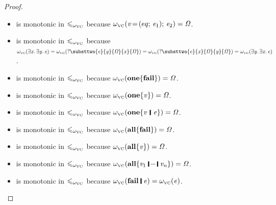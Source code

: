 \begin{proof}
\begin{itemize}
\item {} is monotonic in $\mathrel{\leqslant_{\omega_{\scriptscriptstyle\mathrm{VC}}}}$
because $\omega_{\scriptscriptstyle\mathrm{VC}}(\mathit{v}\hspace{-0.14em}=\hspace{-0.14em}(eq;\,\mathit{e}_{\mathrm{1}});\,\mathit{e}_{\mathrm{2}}) = \mathit{\Omega}$.

\item {} is monotonic in $\mathrel{\leqslant_{\omega_{\scriptscriptstyle\mathrm{VC}}}}$ \hfill\break
because $\omegavc(\ensuremath{\exists\Varid{x}.\,\exists\Varid{y}.\,\Varid{e}}) = \omegavc({?}\ensuremath{\substtwo{\Varid{e}}{\Varid{y}}{\mathit{\Omega}}{\Varid{x}}{\mathit{\Omega}}}) = \omegavc({?}\ensuremath{\substtwo{\Varid{e}}{\Varid{x}}{\mathit{\Omega}}{\Varid{y}}{\mathit{\Omega}}}) = \omegavc(\ensuremath{\exists\Varid{y}.\,\exists\Varid{x}.\,\Varid{e}})$.

\item {} is monotonic in $\mathrel{\leqslant_{\omega_{\scriptscriptstyle\mathrm{VC}}}}$
because $\omega_{\scriptscriptstyle\mathrm{VC}}(\textbf{one}\{\textbf{fail}\}) = \mathit{\Omega}$.

\item {} is monotonic in $\mathrel{\leqslant_{\omega_{\scriptscriptstyle\mathrm{VC}}}}$
because $\omega_{\scriptscriptstyle\mathrm{VC}}(\textbf{one}\{\mathit{v}\}) = \mathit{\Omega}$.

\item {} is monotonic in $\mathrel{\leqslant_{\omega_{\scriptscriptstyle\mathrm{VC}}}}$
because $\omegavc(\ensuremath{\textbf{one}\{\Varid{v}\hspace{0.2em}\mathop{\rule[-0.1em]{0.15em}{0.75em}}\hspace{0.2em}\Varid{e}\}}) = \ensuremath{\mathit{\Omega}}$.

\item {} is monotonic in $\mathrel{\leqslant_{\omega_{\scriptscriptstyle\mathrm{VC}}}}$
because $\omega_{\scriptscriptstyle\mathrm{VC}}(\textbf{all}\{\textbf{fail}\}) = \mathit{\Omega}$.

\item {} is monotonic in $\mathrel{\leqslant_{\omega_{\scriptscriptstyle\mathrm{VC}}}}$
because $\omega_{\scriptscriptstyle\mathrm{VC}}(\textbf{all}\{\mathit{v}\}) = \mathit{\Omega}$.

\item {} is monotonic in $\mathrel{\leqslant_{\omega_{\scriptscriptstyle\mathrm{VC}}}}$
because $\omegavc(\ensuremath{\textbf{all}\{\Varid{v}_{\mathrm{1}}\;\rule[-0.1em]{0.15em}{0.75em}\;\mydots\;\rule[-0.1em]{0.15em}{0.75em}\;\Varid{v}_{\Varid{n}}\}}) = \ensuremath{\mathit{\Omega}}$.

\item {} is monotonic in $\mathrel{\leqslant_{\omega_{\scriptscriptstyle\mathrm{VC}}}}$
because $\omegavc(\ensuremath{\textbf{fail}\;\rule[-0.1em]{0.15em}{0.75em}\;\Varid{e}}) = \omegavc(\ensuremath{\Varid{e}})$.


\end{itemize}
\end{proof}
